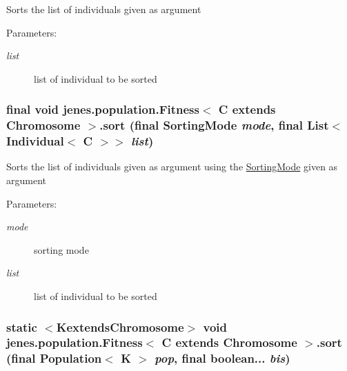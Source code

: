 Sorts the list of individuals given as argument

\begin{Desc}
\item[Parameters:]
\begin{description}
\item[{\em list}]list of individual to be sorted \end{description}
\end{Desc}
\hypertarget{classjenes_1_1population_1_1_fitness_3_01_c_01extends_01_chromosome_01_4_3b46414d970cf62539adcd5a3e065268}{
\subsubsection[sort]{\setlength{\rightskip}{0pt plus 5cm}final void jenes.population.Fitness$<$ C extends Chromosome $>$.sort (final {\bf SortingMode} {\em mode}, \/  final List$<$ Individual$<$ C $>$$>$ {\em list})}}
\label{classjenes_1_1population_1_1_fitness_3_01_c_01extends_01_chromosome_01_4_3b46414d970cf62539adcd5a3e065268}


Sorts the list of individuals given as argument using the \hyperlink{}{SortingMode} given as argument 

\begin{Desc}
\item[Parameters:]
\begin{description}
\item[{\em mode}]sorting mode \item[{\em list}]list of individual to be sorted \end{description}
\end{Desc}
\hypertarget{classjenes_1_1population_1_1_fitness_3_01_c_01extends_01_chromosome_01_4_2601adaae23ba51f4f078b2e47bac2bf}{
\subsubsection[sort]{\setlength{\rightskip}{0pt plus 5cm}static $<$KextendsChromosome$>$ void jenes.population.Fitness$<$ C extends Chromosome $>$.sort (final Population$<$ K $>$ {\em pop}, \/  final boolean... {\em bis})}}
\label{classjenes_1_1population_1_1_fitness_3_01_c_01extends_01_chromosome_01_4_2601adaae23ba51f4f078b2e47bac2bf}


